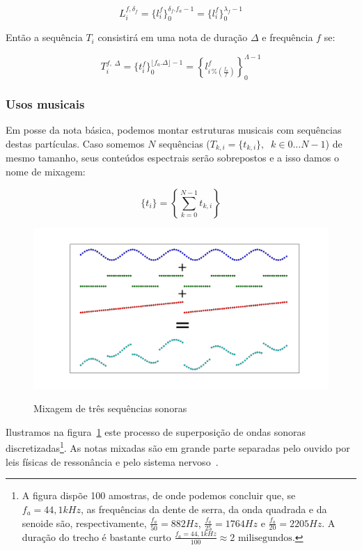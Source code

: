 \begin{equation}\label{periodoUnico}
L_i^{f , \delta_f } = \{ l_i^f \}_0^{\delta_f . f_a -1}=\{ l_i^f \}_0^{\lambda_f-1}
\end{equation}

Então a sequência $T_i$ consistirá em uma nota de duração $\Delta$ e frequência $f$ se:

\begin{equation}
T_i^{f,\; \Delta}=\{t_i^f\}_0^{\lfloor f_a . \Delta \rfloor -1}=\left \{ l^f_{i\,\%\left(\frac{f_a}{f}\right)} \right \}_0^{\Lambda-1}
\end{equation}


\subsubsection{Usos musicais}


Em posse da nota básica, podemos montar estruturas musicais com
sequências destas partículas. Caso somemos $N$ sequências ($T_{k,i}=\{t_{k,i}\}, \;\; k \in 0...N-1$) de mesmo tamanho, seus conteúdos espectrais serão sobrepostos e a isso damos o nome de mixagem:

\begin{equation}\label{eq:mixagem}
\{t_i\}=\left \{ \sum_{k=0}^{N-1}t_{k,i} \right \}
\end{equation}

\begin{figure}[h!]
    \centering
    \caption{Mixagem de três sequências sonoras}
        \includegraphics[width=\textwidth]{figuras/mixagem}
        \label{fig:mixagem}
\end{figure}


Ilustramos na figura~\ref{fig:mixagem} este processo de superposição de ondas sonoras discretizadas\footnote{A figura dispõe 100 amostras, de onde podemos concluir que, se $f_a=44,1kHz$, as frequências da dente de serra, da onda quadrada e da senoide são,
respectivamente, $\frac{f_a}{50}=882Hz$, $\frac{f_a}{25}=1764Hz$ e $\frac{f_a}{20}=2205Hz$. A duração do trecho é bastante curto $\frac{f_a=44,1kHz}{100} \approx 2 \text{ milisegundos}$.}.
 As notas mixadas são em grande parte separadas pelo ouvido por leis físicas de ressonância e pelo sistema nervoso~\cite{Roederer}.

